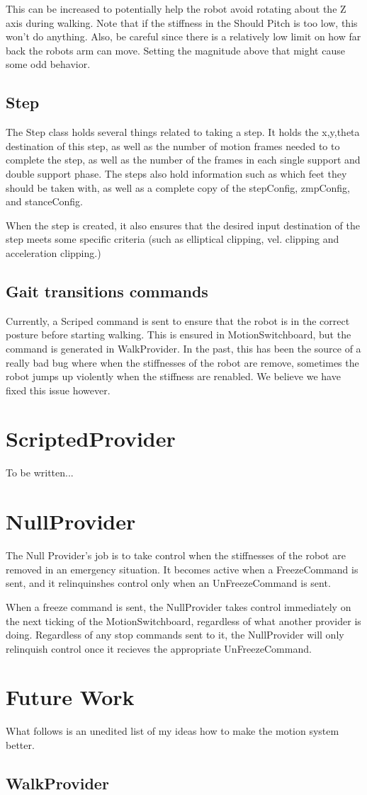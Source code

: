 \documentclass[11pt]{article}
\begin{document}
This can be increased to potentially help the robot avoid rotating about
the Z axis during walking. Note that if the stiffness in the Should Pitch is
too low, this won't do anything. Also, be careful since there is a relatively
low limit on how far back the robots arm can move. Setting the magnitude above
that might cause some odd behavior.

\subsection{Step}
The Step class holds several things related to taking a step. It holds
the x,y,theta destination of this step, as well as the number of motion
frames needed to to complete the step, as well as the number of the frames
in each single support and double support phase. The steps also
hold information such as which feet they should be taken with, as well
as a complete copy of the stepConfig, zmpConfig, and stanceConfig.

When the step is created, it also ensures that the desired input destination
of the step meets some specific criteria (such as elliptical clipping, vel.
clipping and acceleration clipping.)

\subsection{Gait transitions commands}
Currently, a Scriped command is sent to ensure that the robot is in the correct
posture before starting walking.  This is ensured in MotionSwitchboard,
but the command is generated in WalkProvider.  In the past, this has been
the source of a really bad bug where when the stiffnesses of the robot
are remove, sometimes the robot jumps up violently when the stiffness
are renabled. We believe we have fixed this issue however.

\section{ScriptedProvider}
To be written...
\section{NullProvider}
The Null Provider's job is to take control when the stiffnesses of the robot
are removed in an emergency situation.  It becomes active when a FreezeCommand
is sent, and it relinquinshes control only when an UnFreezeCommand is sent.

When a freeze command is sent, the NullProvider takes control immediately on
the next ticking of the MotionSwitchboard, regardless of what another provider
is doing.  Regardless of any stop commands sent to it, the NullProvider will
only relinquish control once it recieves the appropriate UnFreezeCommand.


\section{Future Work}
What follows is an unedited list of my ideas how to make the motion system better.
\subsection{WalkProvider}
\end{document}
